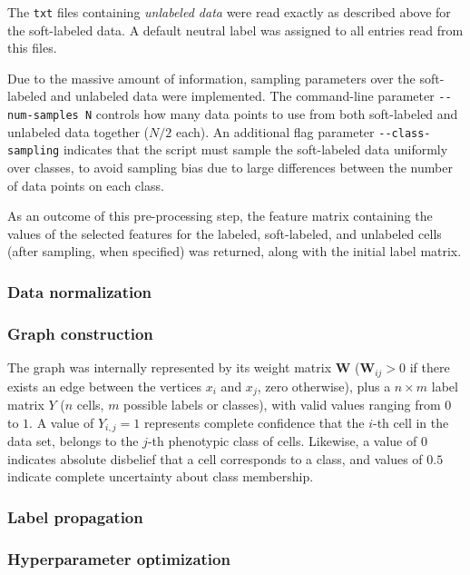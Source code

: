 \documentclass[oneside, a4paper, draft]{memoir} %
\begin{document}
The \texttt{txt} files containing \emph{unlabeled data} were read exactly as described above for the soft-labeled
data. A default neutral label was assigned to all entries read from this files.

Due to the massive amount of information, sampling parameters over the soft-labeled and unlabeled data were
implemented. The command-line parameter \texttt{-{}-num-samples N} controls how many data points to use from both
soft-labeled and unlabeled data together ($N/2$ each). An additional flag parameter \texttt{-{}-class-sampling}
indicates that the script must sample the soft-labeled data uniformly over classes, to avoid sampling bias due to
large differences between the number of data points on each class.

As an outcome of this pre-processing step, the feature matrix containing the values of the selected features
for the labeled, soft-labeled, and unlabeled cells (after sampling, when specified) was returned, along with
the initial label matrix.

\subsubsection{Data normalization}
\lipsum[75]

\subsubsection{Graph construction}
The graph was internally represented by its weight matrix $\mathbf W$ ($\mathbf{W}_{ij}>0$ if there exists
an edge between the vertices $x_i$ and $x_j$, zero otherwise), plus a $n \times m$ label matrix $Y$ 
($n$ cells, $m$ possible labels or classes), with valid values ranging from $0$ to $1$. A value
of $Y_{i,j}=1$ represents complete confidence that the $i$-th cell in the data set, belongs to the $j$-th
phenotypic class of cells. Likewise, a value of $0$ indicates absolute disbelief that a cell corresponds to a
class, and values of $0.5$ indicate complete uncertainty about class membership.

\subsubsection{Label propagation}
\textcolor{gray}{\lipsum[44]}

\subsubsection{Hyperparameter optimization}
\lipsum[33]
\end{document}
